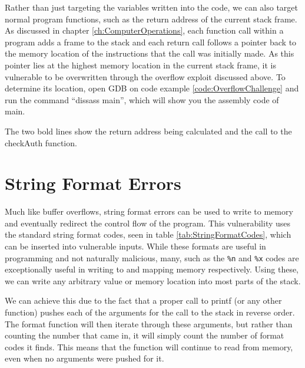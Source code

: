 			Rather than just targeting the variables written into the code, we can also target normal program functions,
			such as the return address of the current stack frame.
			As discussed in chapter \ref{ch:ComputerOperations},
			each function call within a program adds a frame to the stack and each return call follows a pointer back to the memory location of the instructions that the call was initially made.
			As this pointer lies at the highest memory location in the current stack frame, it is vulnerable to be overwritten through the overflow exploit discussed above.
			To determine its location, open GDB on code example \ref{code:OverflowChallenge} and run the command ``dissass main'', which will show you the assembly code of main.
			
		The two bold lines show the return address being calculated and the call to the checkAuth function. %

	\section{String Format Errors}
		Much like buffer overflows, string format errors can be used to write to memory and eventually redirect the control flow of the program.
		This vulnerability uses the standard string format codes, seen in table \ref{tab:StringFormatCodes}, which can be inserted into vulnerable inputs.
		While these formats are useful in programming and not naturally malicious, many, such as the \verb+%n+ and \verb+%x+ codes are exceptionally useful in writing to and mapping memory respectively.
		Using these, we can write any arbitrary value or memory location into most parts of the stack.

		We can achieve this due to the fact that a proper call to printf (or any other function) pushes each of the arguments for the call to the stack in reverse order.
		The format function will then iterate through these arguments, but rather than counting the number that came in, it will simply count the number of format codes it finds.
		This means that the function will continue to read from memory, even when no arguments were pushed for it.
